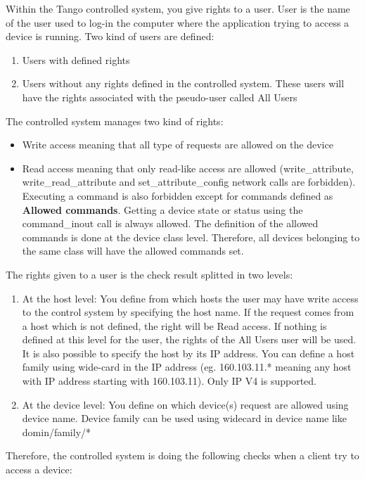 Within the Tango controlled system, you give rights to a user. User
is the name of the user used to log-in the computer where the application
trying to access a device is running. Two kind of users are defined:
\begin{enumerate}
\item Users with defined rights
\item Users without any rights defined in the controlled system. These users
will have the rights associated with the pseudo-user called \textquotedbl{}All
Users\textquotedbl{}
\end{enumerate}
The controlled system manages two kind of rights:
\begin{itemize}
\item Write access meaning that all type of requests are allowed on the
device
\item Read access meaning that only read-like access are allowed (write\_attribute,
write\_read\_attribute and set\_attribute\_config network calls are
forbidden). Executing a command is also forbidden except for commands
defined as \textquotedbl{}\textbf{Allowed commands}\textquotedbl{}.
Getting a device state or status using the command\_inout call is
always allowed. The definition of the allowed commands is done at
the device class level. Therefore, all devices belonging to the same
class will have the allowed commands set.
\end{itemize}
The rights given to a user is the check result splitted in two levels:
\begin{enumerate}
\item At the host level: You define from which hosts the user may have write
access to the control system by specifying the host name. If the request
comes from a host which is not defined, the right will be Read access.
If nothing is defined at this level for the user, the rights of the
\textquotedbl{}All Users\textquotedbl{} user will be used. It is also
possible to specify the host by its IP address. You can define a host
family using wide-card in the IP address (eg. 160.103.11.{*} meaning
any host with IP address starting with 160.103.11). Only IP V4 is
supported. 
\item At the device level: You define on which device(s) request are allowed
using device name. Device family can be used using widecard in device
name like domin/family/{*}
\end{enumerate}
Therefore, the controlled system is doing the following checks when
a client try to access a device:
